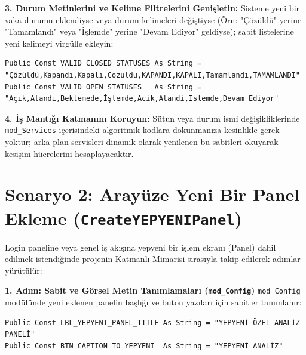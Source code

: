\vspace{0.15cm}

\textbf{\textcolor{primary}{3. Durum Metinlerini ve Kelime Filtrelerini Genişletin:}}
Sisteme yeni bir vaka durumu eklendiyse veya durum kelimeleri değiştiyse (Örn: "Çözüldü" yerine "Tamamlandı" veya "İşlemde" yerine "Devam Ediyor" geldiyse); sabit listelerine yeni kelimeyi virgülle ekleyin:
\begin{lstlisting}[caption={Geçerli Durum Sabitlerinin Güncellenmesi}]
Public Const VALID_CLOSED_STATUSES As String = "Çözüldü,Kapandı,Kapalı,Cozuldu,KAPANDI,KAPALI,Tamamlandı,TAMAMLANDI"
Public Const VALID_OPEN_STATUSES   As String = "Açık,Atandı,Beklemede,İşlemde,Acik,Atandi,Islemde,Devam Ediyor"
\end{lstlisting}

\vspace{0.15cm}

\textbf{\textcolor{primary}{4. İş Mantığı Katmanını Koruyun:}}
Sütun veya durum ismi değişikliklerinde \texttt{mod\_Services} içerisindeki algoritmik kodlara dokunmanıza kesinlikle gerek yoktur; arka plan servisleri dinamik olarak yenilenen bu sabitleri okuyarak kesişim hücrelerini hesaplayacaktır.

\newpage

\section{Senaryo 2: Arayüze Yeni Bir Panel Ekleme (\texttt{CreateYEPYENIPanel})}

Login paneline veya genel iş akışına yepyeni bir işlem ekranı (Panel) dahil edilmek istendiğinde projenin Katmanlı Mimarisi sırasıyla takip edilerek adımlar yürütülür:

\vspace{0.2cm}

\textbf{\textcolor{primary}{1. Adım: Sabit ve Görsel Metin Tanımlamaları (\texttt{mod\_Config})}}
\texttt{mod\_Config} modülünde yeni eklenen panelin başlığı ve buton yazıları için sabitler tanımlanır:
\begin{lstlisting}[caption={Yeni Panel Sabitlerinin Tanımlanması}]
Public Const LBL_YEPYENI_PANEL_TITLE As String = "YEPYENİ ÖZEL ANALİZ PANELİ"
Public Const BTN_CAPTION_TO_YEPYENI  As String = "YEPYENİ ANALİZ"
\end{lstlisting}

\vspace{0.2cm}

